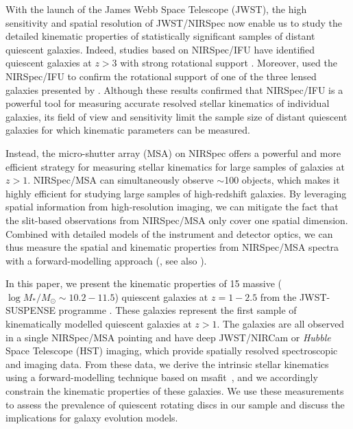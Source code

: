 \documentclass{aa}
\newcommand{\msafit}{{\sc msafit}}
\begin{document}
With the launch of the James Webb Space Telescope (JWST), the high sensitivity and spatial resolution of JWST/NIRSpec \citep{PFerruit2022} now enable us to study the detailed kinematic properties of statistically significant samples of distant quiescent galaxies. Indeed, studies based on NIRSpec/IFU have identified quiescent galaxies at $z>3$ with strong rotational support \citep{FdEugenio2024,RPascalau2025}. Moreover, \citet{ANewman2025} used the NIRSpec/IFU to confirm the rotational support of one of the three lensed galaxies presented by \citet{ANewman2018b}. Although these results confirmed that NIRSpec/IFU is a powerful tool for measuring accurate resolved stellar kinematics of individual galaxies, its field of view and sensitivity limit the sample size of distant quiescent galaxies for which kinematic parameters can be measured.

Instead, the micro-shutter array (MSA) on NIRSpec offers a powerful and more efficient strategy for measuring stellar kinematics for large samples of galaxies at $z>1$. NIRSpec/MSA can simultaneously observe $\sim$100 objects, which makes it highly efficient for studying large samples of high-redshift galaxies. By leveraging spatial information from high-resolution imaging, we can mitigate the fact that the slit-based observations from NIRSpec/MSA only cover one spatial dimension. Combined with detailed models of the instrument and detector optics, we can thus measure the spatial and kinematic properties from NIRSpec/MSA spectra with a forward-modelling approach (\citealt{AdeGraaff2024_kinematics}, see also \citealt{SPrice2016,SPrice2020, JvanHoudt2021,CStraatman2022}). 

In this paper, we present the kinematic properties of 15 massive ($\log M_*/M_{\odot} \sim 10.2-11.5$) quiescent galaxies at $z = 1 -2.5$ from the JWST-SUSPENSE programme \citep{MSlob2024}. These galaxies represent the first sample of kinematically modelled quiescent galaxies at $z>1$. The galaxies are all observed in a single NIRSpec/MSA pointing and have deep JWST/NIRCam or \textit{Hubble} Space Telescope (HST) imaging, which provide spatially resolved spectroscopic and imaging data. From these data, we derive the intrinsic stellar kinematics using a forward-modelling technique based on \msafit\ \citep{AdeGraaff2024_kinematics}, and we accordingly constrain the kinematic properties of these galaxies. We use these measurements to assess the prevalence of quiescent rotating discs in our sample and discuss the implications for galaxy evolution models.
\end{document}
